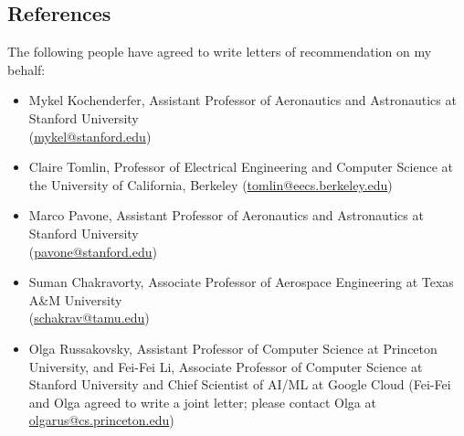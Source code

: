 \documentclass[10pt,roman]{moderncv}
\newcommand{\mailto}[1]{\href{mailto:#1}{#1}}
\begin{document}
\begin{references}

\section{References}

The following people have agreed to write letters of recommendation on my behalf:\\
\begin{itemize}
    \item[] Mykel Kochenderfer, Assistant Professor of Aeronautics and Astronautics at Stanford University\\(\mailto{mykel@stanford.edu})

    \item[] Claire Tomlin, Professor of Electrical Engineering and Computer Science at the University of California, Berkeley (\mailto{tomlin@eecs.berkeley.edu})

    \item[] Marco Pavone, Assistant Professor of Aeronautics and Astronautics at Stanford University\\ (\mailto{pavone@stanford.edu})

    \item[] Suman Chakravorty, Associate Professor of Aerospace Engineering at Texas A\&M University\\ (\mailto{schakrav@tamu.edu})

    \item[] Olga Russakovsky, Assistant Professor of Computer Science at Princeton University, and Fei-Fei Li, Associate Professor of Computer Science at Stanford University and Chief Scientist of AI/ML at Google Cloud (Fei-Fei and Olga agreed to write a joint letter; please contact Olga at \mailto{olgarus@cs.princeton.edu})

\end{itemize}

\end{references}
\end{document}
